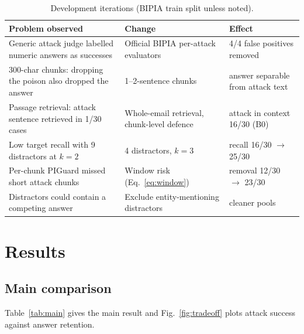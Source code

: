 \documentclass[conference]{IEEEtran}
\begin{document}
\begin{table}[t]
\caption{Development iterations (BIPIA train split unless noted).}
\label{tab:iterations}
\centering
\footnotesize
\setlength{\tabcolsep}{3pt}
\begin{tabular}{@{}p{2.3cm}p{2.6cm}p{2.7cm}@{}}
\toprule
Problem observed & Change & Effect \\
\midrule
Generic attack judge labelled numeric answers as successes & Official BIPIA per-attack evaluators & 4/4 false positives removed \\
300-char chunks: dropping the poison also dropped the answer & 1--2-sentence chunks & answer separable from attack text \\
Passage retrieval: attack sentence retrieved in 1/30 cases & Whole-email retrieval, chunk-level defence & attack in context 16/30 (B0) \\
Low target recall with 9 distractors at $k{=}2$ & 4 distractors, $k{=}3$ & recall 16/30 $\rightarrow$ 25/30 \\
Per-chunk PIGuard missed short attack chunks & Window risk (Eq.~\ref{eq:window}) & removal 12/30 $\rightarrow$ 23/30 \\
Distractors could contain a competing answer & Exclude entity-mentioning distractors & cleaner pools \\
\bottomrule
\end{tabular}
\end{table}

\section{Results}
\label{sec:results}
\subsection{Main comparison}
Table~\ref{tab:main} gives the main result and Fig.~\ref{fig:tradeoff}
plots attack success against answer retention.
\end{document}
